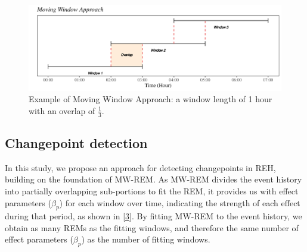 \documentclass[]{interact}
\theoremstyle{plain}%
\theoremstyle{definition}
\theoremstyle{remark}
\begin{document}
{    \begin{figure}[H]
    	\captionsetup{justification=raggedright}
    	\renewcommand{\figurename}{Figure}
    	\centering
    	\includegraphics[width=13cm]{MW}
    	\caption{\fontsize{8}{10}\selectfont Example of Moving Window Approach: a window length of 1 hour with an overlap of $\frac{1}{3}$.}
    	\label{Figure 2}
    \end{figure}
    
	
	\subsection{Changepoint detection} \label{sec:CP detection}
	
	\hspace{0.2cm} In this study, we propose an approach for detecting changepoints in REH, building on the foundation of MW-REM. As MW-REM divides the event history into partially overlapping sub-portions to fit the REM, it provides us with effect parameters ($\beta_p$) for each window over time, indicating the strength of each effect during that period, as shown in \autoref{3}. By fitting MW-REM to the event history, we obtain as many REMs as the fitting windows, and therefore the same number of effect parameters ($\beta_p$) as the number of fitting windows. \\
	
}
\end{document}
